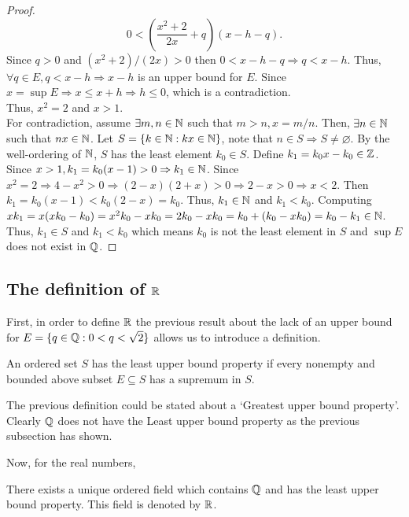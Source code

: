 \begin{proof}
    \begin{equation*}
        0 < \left(
            \frac{x^2+2}{2x} + q
        \right)(x-h-q).
    \end{equation*}
    Since $q > 0$ and $(x^2+2)/(2x) > 0$ then $0 < x-h-q \Rightarrow q < x-h$. Thus, $\forall q \in E, q < x - h \Rightarrow x-h$ is an upper bound for $E$. Since $x = \sup E \Rightarrow x \leq x + h \Rightarrow h \leq 0$, which is a contradiction. \\
    Thus, $x^2 = 2$ and $x > 1$. \\
    For contradiction, assume $\exists m,n \in \mathbb{N}$ such that $m > n, x = m/n$. Then, $\exists n \in \mathbb{N}$ such that $nx \in \mathbb{N}$. Let $S = \{ k \in \mathbb{N}: kx \in \mathbb{N}\}$, note that $n \in S \Rightarrow S \neq \varnothing$. By the well-ordering of $\mathbb{N}$, $S$ has the least element $k_0 \in S$. Define $k_1 = k_0x-k_0 \in \mathbb{Z}$. Since $x > 1, k_1 = k_0(x-1) > 0 \Rightarrow k_1 \in \mathbb{N}$. Since $x^2 = 2 \Rightarrow 4 - x^2 > 0 \Rightarrow (2-x)(2+x) > 0 \Rightarrow 2-x > 0 \Rightarrow x < 2$. Then $k_1 = k_0(x-1) < k_0(2-x) = k_0$. Thus, $k_1 \in \mathbb{N}$ and $k_1 < k_0$. Computing $xk_1 = x(xk_0 -k_0) = x^2k_0 - xk_0 = 2k_0 - xk_0 = k_0 + (k_0 - xk_0) = k_0 - k_1 \in \mathbb{N}$. Thus, $k_1 \in S$ and $k_1 < k_0$ which means $k_0$ is not the least element in $S$ and $\sup E$ does not exist in $\mathbb{Q}$.
\end{proof}

\subsection{The definition of $\R$}

First, in order to define $\R$ the previous result about the lack of an upper bound for $E = \{ q \in \mathbb{Q}: 0 < q < \sqrt{2}\}$ allows us to introduce a definition.

\begin{definition}
    An ordered set $S$ has the least upper bound property if every nonempty and bounded above subset $E \subseteq S$ has a supremum in $S$.
\end{definition}

The previous definition could be stated about a `Greatest upper bound property'. Clearly $\mathbb{Q}$ does not have the Least upper bound property as the previous subsection has shown.

Now, for the real numbers,

\begin{theorem}[Existence of $\R$]
    There exists a unique ordered field which contains $\mathbb{Q}$ and has the least upper bound property. This field is denoted by $\R$.
\end{theorem}

